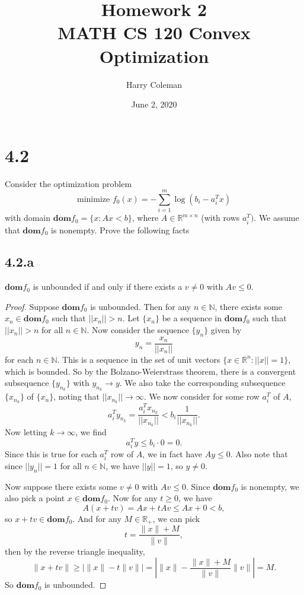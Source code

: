 \documentclass[12pt]{article}
\newcommand{\N}{\mathbb{N}}
\newcommand{\R}{\mathbb{R}}
\begin{document}
 
\title{Homework 2\\
    \large MATH CS 120 Convex Optimization}
\author{Harry Coleman}
\date{June 2, 2020}
\maketitle

\section*{4.2}
 Consider the optimization problem
\[\text{minimize } f_0(x)=-\sum_{i=1}^m\log(b_i-a_i^Tx)\]
with domain $\textbf{dom}f_0=\{x : Ax < b\}$, where $A\in\R^{m\times n}$ (with rows $a_i^T)$. We assume that $\textbf{dom}f_0$ is nonempty. Prove the following facts

\subsection*{4.2.a}
$\textbf{dom}f_0$ is unbounded if and only if there exists a $v\ne0$ with $Av\leq0$.

\begin{proof}
    Suppose $\textbf{dom}f_0$ is unbounded. Then for any $n\in\N$, there exists some $x_n\in\textbf{dom}f_0$ such that $||x_n||>n$. Let $\{x_n\}$ be a sequence in $\textbf{dom}f_0$ such that $||x_n||>n$ for all $n\in\N$. Now consider the sequence $\{y_n\}$ given by
    \[y_n=\frac{x_n}{||x_n||}\]
    for each $n\in\N$. This is a sequence in the set of unit vectors $\{x\in\R^n : ||x||=1\}$, which is bounded. So by the Bolzano-Weierstrass theorem, there is a convergent subsequence $\{y_{n_k}\}$ with $y_{n_k}\to y$. We also take the corresponding subsequence $\{x_{n_k}\}$ of $\{x_n\}$, noting that $||x_{n_k}||\to\infty$. We now consider for some row $a_i^T$ of $A$,
    \[a_i^Ty_{n_k} = \frac{a_i^Tx_{n_k}}{||x_{n_k}||} < b_i\frac{1}{||x_{n_k}||}.\]
    Now letting $k\to\infty$, we find
    \[a_i^Ty \leq b_i\cdot0 = 0.\]
    Since this is true for each $a_i^T$ row of $A$, we in fact have $Ay\leq 0$. Also note that since $||y_n||=1$ for all $n\in\N$, we have $||y||=1$, so $y\ne 0$.
    
    Now suppose there exists some $v\ne0$ with $Av\leq0$. Since $\textbf{dom}f_0$ is nonempty, we also pick a point $x\in\textbf{dom}f_0$. Now for any $t\geq0$, we have
    \[A(x+tv) = Ax + tAv \leq Ax + 0 < b,\]
    so $x+tv\in\textbf{dom}f_0$. And for any $M\in\R_+$, we can pick
    \[t=\frac{\|x\|+M}{\|v\|},\]
    then by the reverse triangle inequality,
    \[\|x+tv\| \geq \left|\|x\|-t\|v\|\right| = \left|\|x\|-\frac{\|x\|+M}{\|v\|}\|v\|\right| = M.\]
    So $\textbf{dom}f_0$ is unbounded.
    
\end{proof}
\end{document}
